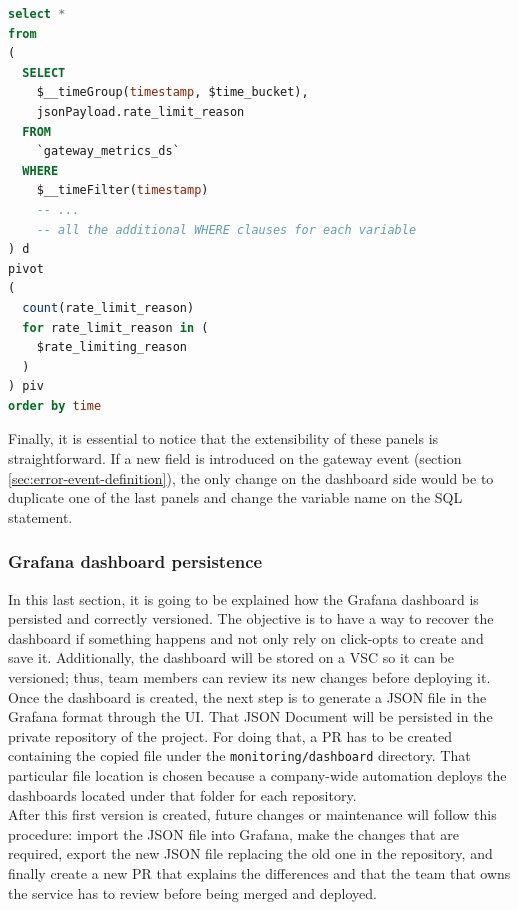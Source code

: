 \documentclass[english, 12pt, a4paper, sci, utf8, a-1b, online]{aaltothesis}
\begin{document}
\begin{lstlisting}[language=sql,firstnumber=1]
select *
from
(
  SELECT
    $__timeGroup(timestamp, $time_bucket),
    jsonPayload.rate_limit_reason
  FROM 
    `gateway_metrics_ds`
  WHERE 
    $__timeFilter(timestamp)
    -- ...
    -- all the additional WHERE clauses for each variable
) d
pivot
(
  count(rate_limit_reason)
  for rate_limit_reason in (
    $rate_limiting_reason
  )
) piv
order by time
\end{lstlisting}

Finally, it is essential to notice that the extensibility of these panels is straightforward. If a new field is introduced on the gateway event (section \ref{sec:error-event-definition}), the only change on the dashboard side would be to duplicate one of the last panels and change the variable name on the SQL statement.

\subsubsection{Grafana dashboard persistence}

In this last section, it is going to be explained how the Grafana dashboard is persisted and correctly versioned. The objective is to have a way to recover the dashboard if something happens and not only rely on click-opts to create and save it. Additionally, the dashboard will be stored on a VSC so it can be versioned; thus, team members can review its new changes before deploying it.\\

Once the dashboard is created, the next step is to generate a JSON file in the Grafana format \cite{GrafanaJson} through the UI. That JSON Document will be persisted in the private repository of the project. For doing that, a PR has to be created containing the copied file under the \texttt{monitoring/dashboard} directory. That particular file location is chosen because a company-wide automation deploys the dashboards located under that folder for each repository.\\

After this first version is created, future changes or maintenance will follow this procedure: import the JSON file into Grafana, make the changes that are required, export the new JSON file replacing the old one in the repository, and finally create a new PR that explains the differences and that the team that owns the service has to review before being merged and deployed.

\clearpage
\end{document}
